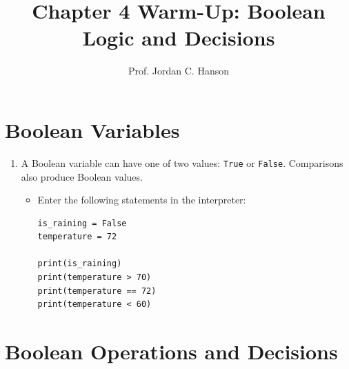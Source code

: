\documentclass{article}
\begin{document}
\twocolumn

\title{Chapter 4 Warm-Up: Boolean Logic and Decisions}
\author{Prof. Jordan C. Hanson}

\maketitle

\section{Boolean Variables}

\begin{enumerate}

\item A Boolean variable can have one of two values:
\texttt{True} or \texttt{False}.  Comparisons also produce
Boolean values.

\begin{itemize}

\item Enter the following statements in the interpreter:

\begin{verbatim}
is_raining = False
temperature = 72

print(is_raining)
print(temperature > 70)
print(temperature == 72)
print(temperature < 60)
\end{verbatim}

\end{itemize}
\end{enumerate}


\section{Boolean Operations and Decisions}
\end{document}
